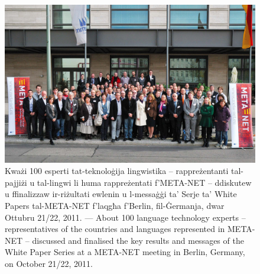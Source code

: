 \begin{figure}[htbp]
  \center
   \includegraphics[width=\textwidth]{../_media/meta-net_team_ebook.jpg}
 \caption{Kważi 100 esperti tat-teknoloġija lingwistika -- rappreżentanti tal-pajjiżi u tal-lingwi li huma rappreżentati f'META-NET -- ddiskutew u ffinalizzaw ir-riżultati ewlenin u l-messaġġi ta' Serje ta’ White Papers tal-META-NET f'laqgħa f'Berlin, fil-Ġermanja, dwar Ottubru 21/22, 2011. --- \textcolor{grey1}{About 100 language technology experts -- representatives of the countries and languages represented in META-NET -- discussed and finalised the key results and messages of the White Paper Series at a META-NET meeting in Berlin, Germany, on October 21/22, 2011.}}
  \medskip
\end{figure}


\cleardoublepage

\label{whitepaperseries}

